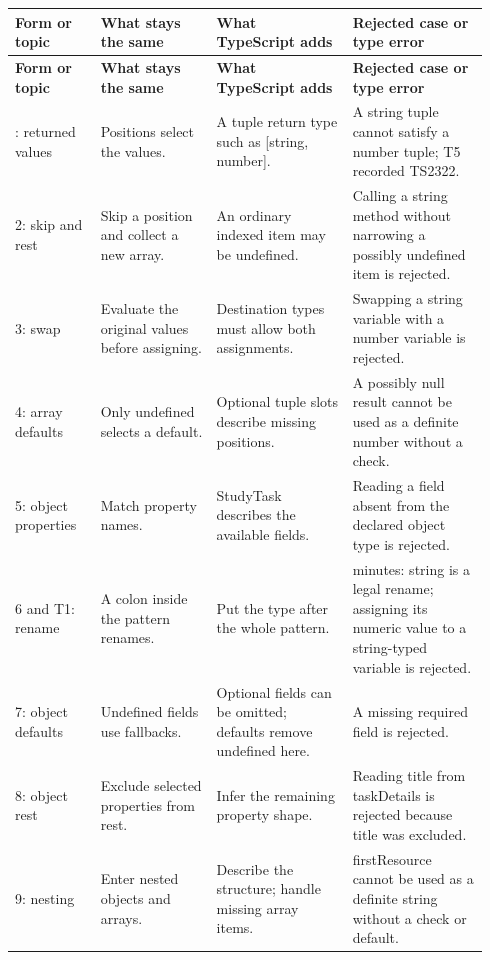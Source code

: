 \documentclass[10pt,a4paper]{article}
\begin{document}
\begingroup\footnotesize\setlength{\tabcolsep}{3pt}
\renewcommand{\arraystretch}{1.25}
\begin{longtable}{@{}L{0.170\linewidth}L{0.230\linewidth}L{0.270\linewidth}L{0.270\linewidth}@{}}
\toprule
\textbf{Form or topic} & \textbf{What stays the same} & \textbf{What TypeScript adds} & \textbf{Rejected case or type error} \\
\midrule\endfirsthead
\toprule
\textbf{Form or topic} & \textbf{What stays the same} & \textbf{What TypeScript adds} & \textbf{Rejected case or type error} \\
\midrule\endhead
\bottomrule{}: returned values & Positions select the values. & A tuple return type such as [string, number]. & A string tuple cannot satisfy a number tuple; T5 recorded TS2322. \\[3pt]
2: skip and rest & Skip a position and collect a new array. & An ordinary indexed item may be undefined. & Calling a string method without narrowing a possibly undefined item is rejected. \\[3pt]
3: swap & Evaluate the original values before assigning. & Destination types must allow both assignments. & Swapping a string variable with a number variable is rejected. \\[3pt]
4: array defaults & Only undefined selects a default. & Optional tuple slots describe missing positions. & A possibly null result cannot be used as a definite number without a check. \\[3pt]
5: object properties & Match property names. & StudyTask describes the available fields. & Reading a field absent from the declared object type is rejected. \\[3pt]
6 and T1: rename & A colon inside the pattern renames. & Put the type after the whole pattern. & minutes: string is a legal rename; assigning its numeric value to a string-typed variable is rejected. \\[3pt]
7: object defaults & Undefined fields use fallbacks. & Optional fields can be omitted; defaults remove undefined here. & A missing required field is rejected. \\[3pt]
8: object rest & Exclude selected properties from rest. & Infer the remaining property shape. & Reading title from taskDetails is rejected because title was excluded. \\[3pt]
9: nesting & Enter nested objects and arrays. & Describe the structure; handle missing array items. & firstResource cannot be used as a definite string without a check or default. \\[3pt]

\end{longtable}
\end{document}
